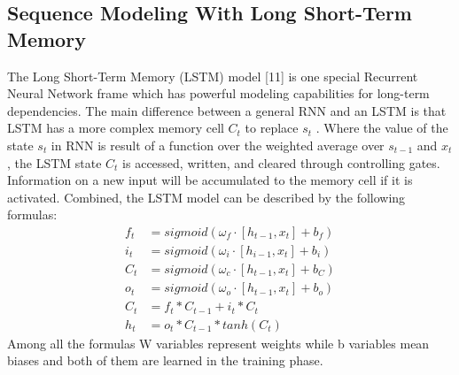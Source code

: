 \documentclass{article}
\begin{document}
\subsection{Sequence Modeling With Long Short-Term Memory }
The Long Short-Term Memory (LSTM) model [11] is
one special Recurrent Neural Network frame which has powerful modeling capabilities for long-term dependencies. The main difference between a general RNN and an LSTM is  that  LSTM  has  a  more  complex  memory  cell $C_{t}$     to replace $s_{t}$  . Where the value of  the state $s_{t}$  in RNN is result of  a function over  the  weighted  average over $s_{t-1}$   and  $x_{t}$  , the LSTM state $C_{t}$   is accessed, written, and cleared through controlling gates. Information on a new input will be accumulated to the memory cell if it is activated. Combined, the LSTM model can be described by the following formulas:
\begin{equation}
    \begin{split}
    f_{t}&=sigmoid(\omega_{f}\cdot[h_{t-1},x_{t}]+b_{f})  \\
    i_{t}&=sigmoid(\omega_{i}\cdot[h_{i-1},x_{t}]+b_{i})  \\
     C_{t}&=sigmoid(\omega_{c}\cdot[h_{t-1},x_{t}]+b_{C})\\
    o_{t}&=sigmoid(\omega_{o}\cdot[h_{t-1},x_{t}]+b_{o}) \\
    C_{t}&=f_{t}*C_{t-1}+i_{t}*C_{t}\\
    h_{t}&=o_{t}*C_{t-1}*tanh(C_{t})
    \end{split}
\end{equation}
Among all the formulas W variables represent weights while b variables mean biases and both of them are learned in the training phase.
\end{document}
